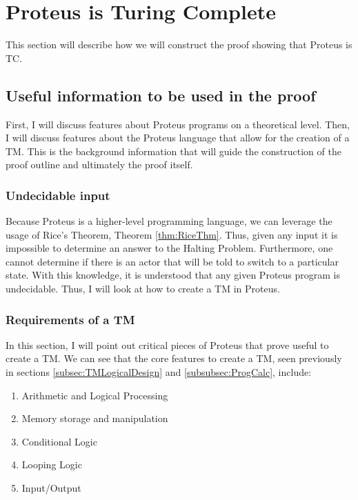 \chapter{Proteus is Turing Complete}\label{chapter:ProteusTC}

This section will describe how we will construct the proof showing that Proteus is TC.

\section{Useful information to be used in the proof}

First, I will discuss features about Proteus programs on a theoretical level.
Then, I will discuss features about the Proteus language that allow for the creation of a TM.
This is the background information that will guide the construction of the proof outline and ultimately the proof itself.

\subsection{Undecidable input}\label{subsec:UndecidableInput}

Because Proteus is a higher-level programming language, we can leverage the usage of Rice's Theorem, Theorem \ref{thm:RiceThm}.
Thus, given any input it is impossible to determine an answer to the Halting Problem.
Furthermore, one cannot determine if there is an actor that will be told to switch to a particular state.
With this knowledge, it is understood that any given Proteus program is undecidable.
Thus, I will look at how to create a TM in Proteus.

\subsection{Requirements of a TM}\label{subsec:ReqsofTM}

In this section, I will point out critical pieces of Proteus that prove useful to create a TM.
We can see that the core features to create a TM, seen previously in sections \ref{subsec:TMLogicalDesign} and \ref{subsubsec:ProgCalc}, include:
\begin{enumerate}
    \item Arithmetic and Logical Processing
    \item Memory storage and manipulation
    \item Conditional Logic
    \item Looping Logic
    \item Input/Output
\end{enumerate}

